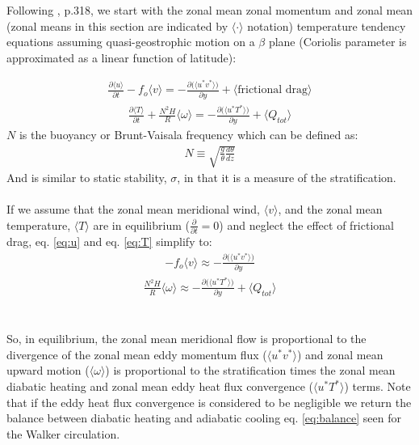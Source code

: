 \documentclass[letterpaper,12pt,titlepage,oneside,final]{book}
\begin{document}
Following \citep{holton_introduction_2004}, p.318, we start with the zonal mean zonal momentum and zonal mean (zonal means in this section are indicated by $\langle \cdot \rangle$ notation) temperature tendency equations assuming quasi-geostrophic motion on a $\beta$ plane (Coriolis parameter is approximated as a linear function of latitude):

\begin{align}\label{eq:u}
\frac{\partial{\langle{{u}}\rangle}}{\partial{t}} - f_{o}\langle{{v}}\rangle = -\frac{\partial\Big(\langle{{u^{*}v^{*}}}\rangle\Big)}{\partial{y}} + \langle{\text{frictional drag}}\rangle
\end{align}
\begin{align}\label{eq:T}
\frac{\partial{\langle{T}\rangle}}{\partial{t}} + \frac{N^{2}H}{R}\langle{\omega}\rangle = -\frac{\partial\Big(\langle{u^{*}T^{*}}\rangle\Big)}{\partial{y}} + \langle{Q_{tot}}\rangle
\end{align}
$N$ is the buoyancy or Brunt-Vaisala frequency which can be defined as: 
\begin{align}
N\equiv\sqrt{\frac{g}{\theta}\frac{d{\theta}}{dz}}
\end{align}
And is similar to static stability, $\sigma$, in that it is a measure of the stratification.
\\
\\
If we assume that the zonal mean meridional wind, $\langle{v}\rangle$, and the zonal mean temperature, $\langle{T}\rangle$ are in equilibrium ($\frac{\partial}{\partial{t}}=0$) and neglect the effect of frictional drag, eq. \ref{eq:u} and eq. \ref{eq:T} simplify to:
\begin{align}
-f_{o}\langle{v}\rangle \approx -\frac{\partial\Big(\langle{u^{*}v^{*}}\rangle\Big)}{\partial{y}}
\end{align}
\begin{align}
\frac{N^{2}H}{R}\langle{\omega}\rangle \approx -\frac{\partial\Big(\langle{u^{*}T^{*}}\rangle\Big)}{\partial{y}} + \langle{Q_{tot}}\rangle
\end{align}
\\
\\
So, in equilibrium, the zonal mean meridional flow is proportional to the divergence of the zonal mean eddy momentum flux ($\langle{u^{*}v^{*}}\rangle$) and zonal mean upward motion ($\langle{\omega}\rangle$) is proportional to the stratification times the zonal mean diabatic heating and zonal mean eddy heat flux convergence ($\langle{u^{*}T^{*}}\rangle$) terms. Note that if the eddy heat flux convergence is considered to be negligible we return the balance between diabatic heating and adiabatic cooling eq. \ref{eq:balance} seen for the Walker circulation. 
\end{document}
